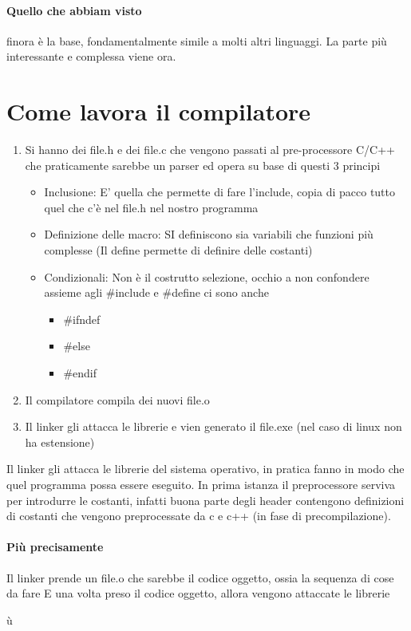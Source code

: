 \documentclass[12pt, a4paper, openany, oneside]{book}
\begin{document}
\paragraph{Quello che abbiam visto }finora è la base, fondamentalmente simile
a molti altri linguaggi. La parte più interessante e  complessa viene ora.
\section{Come lavora il compilatore}
\begin{enumerate}
	\item Si hanno dei file.h e dei file.c che vengono passati al pre-processore C/C++
	che praticamente sarebbe un parser ed opera su base di questi 3 principi
	\begin{itemize}
		\item Inclusione: E' quella che permette di fare l'include, copia di pacco
		tutto quel che c'è nel file.h nel nostro programma
		\item Definizione delle macro: SI definiscono sia variabili che funzioni 
		più complesse (Il define permette di definire delle costanti)
		\item Condizionali: Non è il costrutto selezione, occhio a non confondere
		assieme agli \#include e \#define ci sono anche 
		\begin{itemize}
			\item \#ifndef
			\item \#else
			\item \#endif
		\end{itemize}
	\end{itemize}
	\item Il compilatore compila dei nuovi file.o
	\item Il linker gli attacca le librerie e vien generato il file.exe (nel caso
	di linux non ha estensione)
\end{enumerate}
Il linker gli attacca le librerie del sistema operativo, in pratica fanno in modo
che quel programma possa essere eseguito.
In prima istanza il preprocessore serviva per introdurre le costanti, infatti 
buona parte degli header contengono definizioni di costanti che vengono 
preprocessate da c e c++ (in fase di precompilazione).
\paragraph{Più precisamente} Il linker prende un file.o che sarebbe il codice 
oggetto, ossia la sequenza di cose da fare E una volta preso il codice oggetto,
allora vengono attaccate le librerie

    

    


























ù
\end{document}
